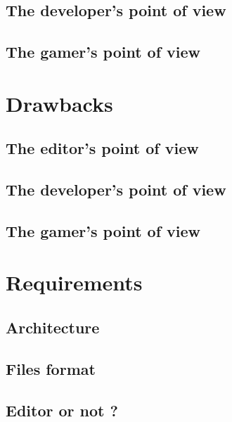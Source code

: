 \documentclass[a4paper,11pt]{article}
\begin{document}
\subsection{The developer's point of view}

\subsection{The gamer's point of view}


\section{Drawbacks }

\subsection{The editor's point of view}

\subsection{The developer's point of view}

\subsection{The gamer's point of view}


\section{Requirements}

\subsection{Architecture}

\subsection{Files format}

\subsection{Editor or not ?}

\newpage
\tableofcontents
\newpage
\end{document}
